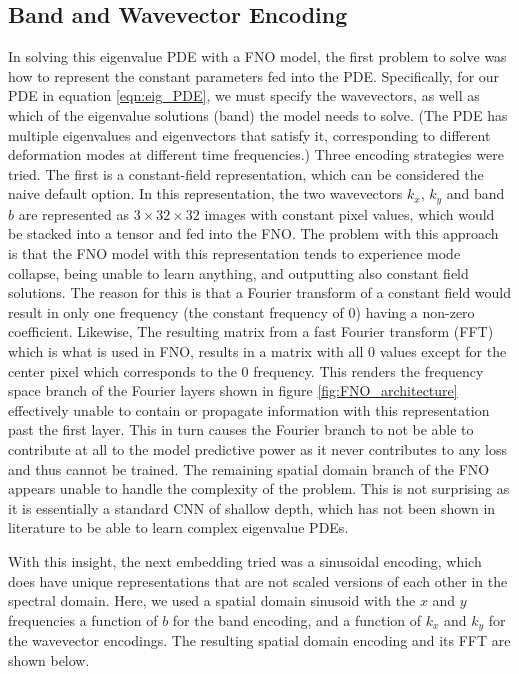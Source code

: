 \documentclass[preprint,review,12pt]{elsarticle}
\begin{document}
\subsection{Band and Wavevector Encoding}
In solving this eigenvalue PDE with a FNO model, the first problem to solve was how to represent the constant parameters fed into the PDE. Specifically, for our PDE in equation \ref{eqn:eig_PDE}, we must specify the wavevectors, as well as which of the eigenvalue solutions (band) the model needs to solve. (The PDE has multiple eigenvalues and eigenvectors that satisfy it, corresponding to different deformation modes at different time frequencies.) Three encoding strategies were tried. The first is a constant-field representation, which can be considered the naive default option. In this representation, the two wavevectors $k_x$, $k_y$ and band $b$ are represented as $3 \times 32 \times 32$ images with constant pixel values, which would be stacked into a tensor and fed into the FNO. The problem with this approach is that the FNO model with this representation tends to experience mode collapse, being unable to learn anything, and outputting also constant field solutions. The reason for this is that a Fourier transform of a constant field would result in only one frequency (the constant frequency of 0) having a non-zero coefficient. Likewise, The resulting matrix from a fast Fourier transform (FFT) which is what is used in FNO, results in a matrix with all 0 values except for the center pixel which corresponds to the 0 frequency. This renders the frequency space branch of the Fourier layers shown in figure \ref{fig:FNO_architecture} effectively unable to contain or propagate information with this representation past the first layer. This in turn causes the Fourier branch to not be able to contribute at all to the model predictive power as it never contributes to any loss and thus cannot be trained. The remaining spatial domain branch of the FNO appears unable to handle the complexity of the problem. This is not surprising as it is essentially a standard CNN of shallow depth, which has not been shown in literature to be able to learn complex eigenvalue PDEs.

With this insight, the next embedding tried was a sinusoidal encoding, which does have unique representations that are not scaled versions of each other in the spectral domain. Here, we used a spatial domain sinusoid with the $x$ and $y$ frequencies a function of $b$ for the band encoding, and a function of $k_x$ and $k_y$ for the wavevector encodings. The resulting spatial domain encoding and its FFT are shown below.
\end{document}
